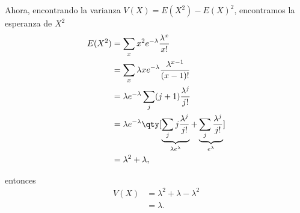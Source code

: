 Ahora, encontrando la varianza $V(X) = E(X^2) - E(X)^2$, encontramos la esperanza de $X^2$
	\begin{align*}
		E(X^2) &= \sum _x x^2 e^{-\lambda} \frac{\lambda ^x}{x!} \\
		&= \sum _x \lambda xe^{-\lambda} \frac{\lambda ^{x - 1}}{(x - 1)!} \\
		&= \lambda e^{-\lambda} \sum _j (j + 1) \frac{\lambda ^j}{j!} \\
		&= \lambda e^{-\lambda} \qty[\underbrace{\sum _j j\frac{\lambda ^j}{j!}}_{\lambda e^\lambda} + \underbrace{\sum _j \frac{\lambda ^j}{j!}}_{e^\lambda}] \\
		&= \lambda ^2 + \lambda ,
	\end{align*}

entonces
\begin{align*}
	V(X) &= \lambda ^2 + \lambda - \lambda ^2 \\
	&= \lambda .
\end{align*}






















